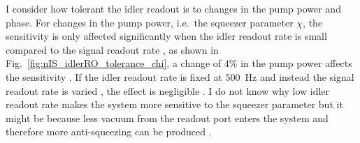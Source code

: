 
I consider how tolerant the idler readout is to changes in the pump power and phase. 
For changes in the pump power, i.e.\ the squeezer parameter $\chi$, the sensitivity is only affected significantly when the idler readout rate is small compared to the signal readout rate , as shown in Fig.~\ref{fig:nIS_idlerRO_tolerance_chi}, a change of $4\%$ in the pump power  affects the sensitivity .  If the idler readout rate is fixed at 500~Hz and instead the signal readout rate is varied , the effect is negligible . I do not know why low idler readout rate makes the system more sensitive to the squeezer parameter but it might be because less vacuum from the readout port enters the system and therefore more anti-squeezing can be produced .

